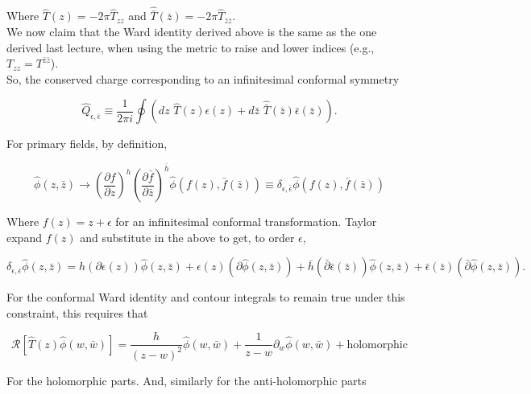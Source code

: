 \noindent Where $\hat{T}(z) = -2\pi \hat{T}_{zz}$ and $\hat{\bar{T}} (\bar{z}) = -2\pi \hat{T}_{\bar{z}\bar{z}}$. \\

\noindent We now claim that the Ward identity derived above is the same as the one derived last lecture, when using the metric to raise and lower indices (e.g., $T_{zz} = T^{\bar{z}\bar{z}}$). \\

\noindent So, the conserved charge corresponding to an infinitesimal conformal symmetry

\begin{equation}
\hat{Q}_{\epsilon, \bar{\epsilon}} \equiv \frac{1}{2\pi i} \oint \left( dz \,\, \hat{T} (z) \epsilon (z) + d\bar{z} \,\, \hat{\bar{T}} (\bar{z}) \bar{\epsilon} (\bar{z}) \right).
\end{equation}

\noindent For primary fields, by definition,

\begin{equation}
\hat{\phi} (z,\bar{z}) \rightarrow \left( \frac{\partial f}{\partial z} \right)^h \left( \frac{\partial \bar{f}}{\partial \bar{z}} \right)^{\bar{h}} \hat{\phi} ( f(z), \bar{f} (\bar{z}) ) \equiv \delta_{\epsilon, \bar{\epsilon}} \hat{\phi} ( f(z), \bar{f}(\bar{z}))
\end{equation}

\noindent Where $f(z) = z + \epsilon$ for an infinitesimal conformal transformation. Taylor expand $f(z)$ and substitute in the above to get, to order $\epsilon$,

\begin{equation}
\delta_{\epsilon, \bar{\epsilon}} \hat{\phi} ( z,\bar{z}) = h(\partial \epsilon (z)) \hat{\phi} (z,\bar{z}) + \epsilon (z) (\partial \hat{\phi} (z,\bar{z})) + \bar{h} (\bar{\partial} \bar{\epsilon} (\bar{z}) )\hat{\phi} (z, \bar{z}) + \bar{\epsilon} (\bar{z}) (\bar{\partial} \hat{\phi} (z, \bar{z}) ).
\end{equation}

\noindent For the conformal Ward identity and contour integrals to remain true under this constraint, this requires that

\begin{equation}
\mathcal{R} [ \hat{T} (z) \hat{\phi} (w, \bar{w}) ] = \frac{h}{(z-w)^2} \hat{\phi} (w, \bar{w}) + \frac{1}{z-w} \partial_w \hat{\phi} (w,\bar{w}) + \text{holomorphic}
\end{equation}

\noindent For the holomorphic parts. And, similarly for the anti-holomorphic parts

